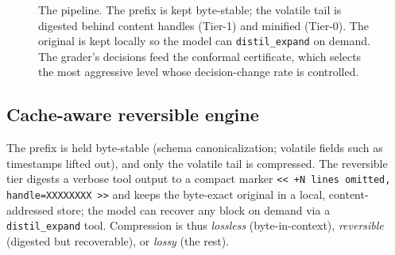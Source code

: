 \documentclass[11pt]{article}
\begin{document}
\begin{figure}[t]
\centering
{}
\caption{The pipeline. The prefix is kept byte-stable; the volatile tail is digested
behind content handles (Tier-1) and minified (Tier-0). The original is kept locally
so the model can \texttt{distil\_expand} on demand. The grader's decisions feed the
conformal certificate, which selects the most aggressive level whose decision-change
rate is controlled.}
\label{fig:pipeline}
\end{figure}

\subsection{Cache-aware reversible engine}
The prefix is held byte-stable (schema canonicalization; volatile fields such as
timestamps lifted out), and only the volatile tail is compressed. The reversible
tier digests a verbose tool output to a compact marker
\verb|<< +N lines omitted, handle=XXXXXXXX >>| and keeps the byte-exact original in a local,
content-addressed store; the model can recover any block on demand via a
\texttt{distil\_expand} tool. Compression is thus \emph{lossless} (byte-in-context),
\emph{reversible} (digested but recoverable), or \emph{lossy} (the rest).
\end{document}
